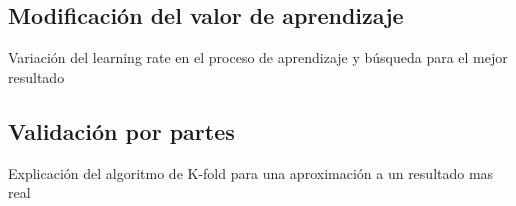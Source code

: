 \subsection{Modificación del valor de aprendizaje}
Variación del learning rate en el proceso de aprendizaje y búsqueda para el mejor resultado

\subsection{Validación por partes}
Explicación del algoritmo de K-fold para una aproximación a un resultado mas real


